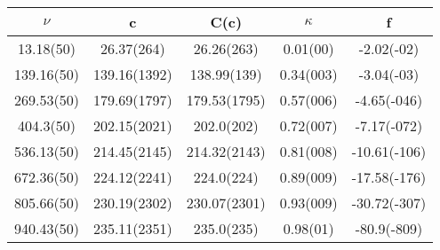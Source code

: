 \begin{table}[H]
	\centering
	\begin{tabular}{ccccc}
		$\nu$ & c & C(c) & $\kappa$ & f\\
		\hline
		13.18(50) & 26.37(264) & 26.26(263) & 0.01(00) & -2.02(-02)	\\
		139.16(50) & 139.16(1392) & 138.99(139) & 0.34(003) & -3.04(-03)	\\
		269.53(50) & 179.69(1797) & 179.53(1795) & 0.57(006) & -4.65(-046)	\\
		404.3(50) & 202.15(2021) & 202.0(202) & 0.72(007) & -7.17(-072)	\\
		536.13(50) & 214.45(2145) & 214.32(2143) & 0.81(008) & -10.61(-106)	\\
		672.36(50) & 224.12(2241) & 224.0(224) & 0.89(009) & -17.58(-176)	\\
		805.66(50) & 230.19(2302) & 230.07(2301) & 0.93(009) & -30.72(-307)	\\
		940.43(50) & 235.11(2351) & 235.0(235) & 0.98(01) & -80.9(-809)	\\
	\end{tabular}
\end{table}
